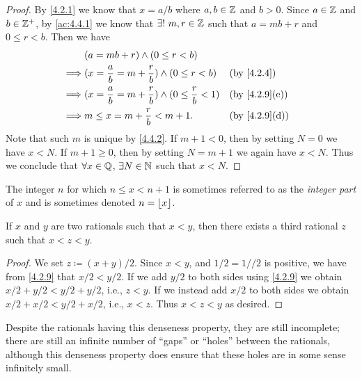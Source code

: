 \begin{proof}
  By \cref{4.2.1} we know that \(x = a / b\) where \(a, b \in \mathbb{Z}\) and \(b > 0\).
  Since \(a \in \mathbb{Z}\) and \(b \in \mathbb{Z}^+\), by \cref{ac:4.4.1} we know that \(\exists!\ m, r \in \mathbb{Z}\) such that \(a = mb + r\) and \(0 \leq r < b\).
  Then we have
  \begin{align*}
             & (a = mb + r) \land (0 \leq r < b)                                                        \\
    \implies & (x = \dfrac{a}{b} = m + \dfrac{r}{b}) \land (0 \leq r < b)            &  & \by{4.2.4}    \\
    \implies & (x = \dfrac{a}{b} = m + \dfrac{r}{b}) \land (0 \leq \dfrac{r}{b} < 1) &  & \by{4.2.9}[e] \\
    \implies & m \leq x = m + \dfrac{r}{b} < m + 1.                                  &  & \by{4.2.9}[d]
  \end{align*}
  Note that such \(m\) is unique by \cref{4.4.2}.
  If \(m + 1 < 0\), then by setting \(N = 0\) we have \(x < N\).
  If \(m + 1 \geq 0\), then by setting \(N = m + 1\) we again have \(x < N\).
  Thus we conclude that \(\forall x \in \mathbb{Q}\), \(\exists N \in \mathbb{N}\) such that \(x < N\).
\end{proof}

\begin{rmk}\label{4.4.2}
  The integer \(n\) for which \(n \leq x < n + 1\) is sometimes referred to as the \emph{integer part} of \(x\) and is sometimes denoted \(n = \left\lfloor x\right\rfloor\).
\end{rmk}

\begin{prop}\label{4.4.3}
  If \(x\) and \(y\) are two rationals such that \(x < y\), then there exists a third rational \(z\) such that \(x < z < y\).
\end{prop}

\begin{proof}
  We set \(z \coloneqq (x + y) / 2\).
  Since \(x < y\), and \(1 / 2 = 1 // 2\) is positive, we have from \cref{4.2.9} that \(x / 2 < y / 2\).
  If we add \(y / 2\) to both sides using \cref{4.2.9} we obtain \(x / 2 + y / 2 < y / 2 + y / 2\), i.e., \(z < y\).
  If we instead add \(x / 2\) to both sides we obtain \(x / 2 + x / 2 < y / 2 + x / 2\), i.e., \(x < z\).
  Thus \(x < z < y\) as desired.
\end{proof}

\begin{note}
  Despite the rationals having this denseness property, they are still incomplete;
  there are still an infinite number of ``gaps'' or ``holes'' between the rationals, although this denseness property does ensure that these holes are in some sense infinitely small.
\end{note}

